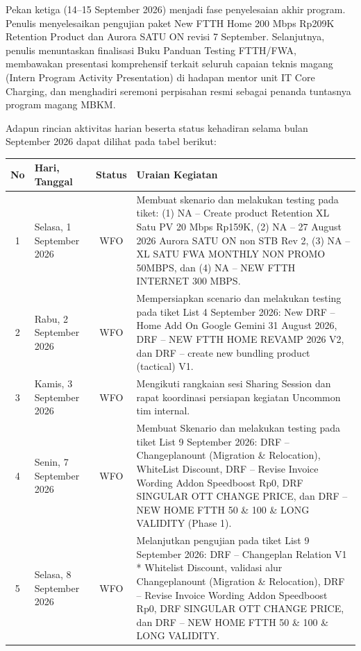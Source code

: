 \documentclass[12pt,a4paper]{article}
\begin{document}
Pekan ketiga (14--15 September 2026) menjadi fase penyelesaian akhir program. Penulis menyelesaikan pengujian paket New FTTH Home 200 Mbps Rp209K Retention Product dan Aurora SATU ON revisi 7 September. Selanjutnya, penulis menuntaskan finalisasi Buku Panduan Testing FTTH/FWA, membawakan presentasi komprehensif terkait seluruh capaian teknis magang (Intern Program Activity Presentation) di hadapan mentor unit IT Core Charging, dan menghadiri seremoni perpisahan resmi sebagai penanda tuntasnya program magang MBKM.

\vspace{0.4cm}
\noindent Adapun rincian aktivitas harian beserta status kehadiran selama bulan September 2026 dapat dilihat pada tabel berikut:

\clearpage
\begin{singlespace}
\noindent
\begin{tabular}{|c|p{2.6cm}|c|p{9.8cm}|}
\hline
\textbf{No} & \textbf{Hari, Tanggal} & \textbf{Status} & \textbf{Uraian Kegiatan} \\
\hline
1 & Selasa, 1 September 2026 & WFO & Membuat skenario dan melakukan testing pada tiket: (1) NA -- Create product Retention XL Satu PV 20 Mbps Rp159K, (2) NA -- 27 August 2026 Aurora SATU ON non STB Rev 2, (3) NA -- XL SATU FWA MONTHLY NON PROMO 50MBPS, dan (4) NA -- NEW FTTH INTERNET 300 MBPS. \\
\hline
2 & Rabu, 2 September 2026 & WFO & Mempersiapkan scenario dan melakukan testing pada tiket List 4 September 2026: New DRF -- Home Add On Google Gemini 31 August 2026, DRF -- NEW FTTH HOME REVAMP 2026 V2, dan DRF -- create new bundling product (tactical) V1. \\
\hline
3 & Kamis, 3 September 2026 & WFO & Mengikuti rangkaian sesi Sharing Session dan rapat koordinasi persiapan kegiatan Uncommon tim internal. \\
\hline
4 & Senin, 7 September 2026 & WFO & Membuat Skenario dan melakukan testing pada tiket List 9 September 2026: DRF -- Changeplanount (Migration \& Relocation), WhiteList Discount, DRF -- Revise Invoice Wording Addon Speedboost Rp0, DRF SINGULAR OTT CHANGE PRICE, dan DRF -- NEW HOME FTTH 50 \& 100 \& LONG VALIDITY (Phase 1). \\
\hline
5 & Selasa, 8 September 2026 & WFO & Melanjutkan pengujian pada tiket List 9 September 2026: DRF -- Changeplan Relation V1 * Whitelist Discount, validasi alur Changeplanount (Migration \& Relocation), DRF -- Revise Invoice Wording Addon Speedboost Rp0, DRF SINGULAR OTT CHANGE PRICE, dan DRF -- NEW HOME FTTH 50 \& 100 \& LONG VALIDITY. \\
\hline
\end{tabular}
\end{singlespace}
\end{document}
